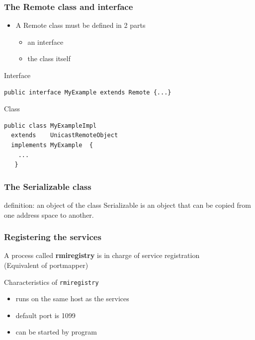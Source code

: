 \documentclass[bigger,hyperref={colorlinks=true, urlcolor=red, plainpages=false, pdfpagelabels, bookmarksnumbered}]{beamer}
\begin{document}
\begin{frame}[fragile]
\frametitle{The Remote class  and interface}
\label{sec-3-4}
\begin{itemize}

\item A Remote class must be defined in 2 parts
\label{sec-3-4-1}%
\begin{itemize}
\item an interface
\item the class itself
\end{itemize}
\end{itemize} %
\begin{block}{Interface}
\label{sec-3-4-2}


\lstset{language=java}
\begin{lstlisting}
public interface MyExample extends Remote {...}
\end{lstlisting}
    
\end{block}
\begin{block}{Class}
\label{sec-3-4-3}


\lstset{language=java}
\begin{lstlisting}
public class MyExampleImpl 
  extends    UnicastRemoteObject
  implements MyExample  {
    ...
   }
\end{lstlisting}
\end{block}
\end{frame}
\begin{frame}
\frametitle{The Serializable class}
\label{sec-3-5}


definition: an object of the class Serializable is an object
that can be copied from one address space to another.
\end{frame}
\begin{frame}
\frametitle{Registering the services}
\label{sec-3-6}

   A process called \textbf{rmiregistry} is in charge of service registration\\
   (Equivalent of portmapper)
\begin{block}{Characteristics of \texttt{rmiregistry}}
\label{sec-3-6-1}

\begin{itemize}
\item runs on the same host as the services
\item default port is 1099
\item can be started by program
\end{itemize}
\end{block}
\end{frame}
\end{document}
